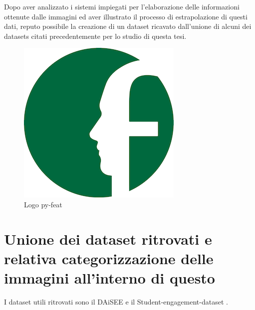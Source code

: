 Dopo aver analizzato i sistemi impiegati per l’elaborazione delle informazioni
ottenute dalle immagini ed aver illustrato il processo di estrapolazione di questi
dati, reputo possibile la creazione di un dataset ricavato dall’unione di alcuni dei
datasets citati precedentemente per lo studio di questa tesi.

\begin{figure}
    \begin{center}    
        \includegraphics[width=0.3\linewidth]{images/pyfeat_logo_small.png}
        \caption{Logo py-feat}
    \end{center}
\end{figure}

\section{Unione dei dataset ritrovati e relativa categorizzazione delle immagini all’interno di questo}

I dataset utili ritrovati sono il DAiSEE \cite{DAiSEE} e il Student-engagement-dataset \cite{StudEngagDataset}.

